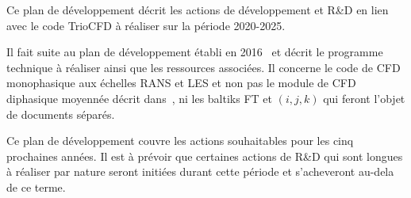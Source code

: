 Ce plan de d\'eveloppement d\'ecrit les actions de d\'eveloppement et R\&D en lien avec le code TrioCFD
\`a r\'ealiser sur la p\'eriode 2020-2025.

Il fait suite au plan de d\'eveloppement \'etabli en 2016~\cite{Plan_dev_Trio_indiceB} et d\'ecrit
le programme technique \`a r\'ealiser ainsi que les ressources associ\'ees. Il concerne le code de CFD
monophasique aux \'echelles RANS et LES et non pas le module de CFD diphasique moyenn\'ee d\'ecrit
dans~\cite{Metaphor}, ni les baltiks FT et $(i,j,k)$ qui feront l'objet de documents s\'epar\'es.

Ce plan de d\'eveloppement couvre les actions souhaitables pour les cinq prochaines ann\'ees. Il est
\`a pr\'evoir que certaines actions de R\&D qui sont longues \`a r\'ealiser par nature seront
initi\'ees durant cette p\'eriode et s'acheveront au-dela de ce terme. 


